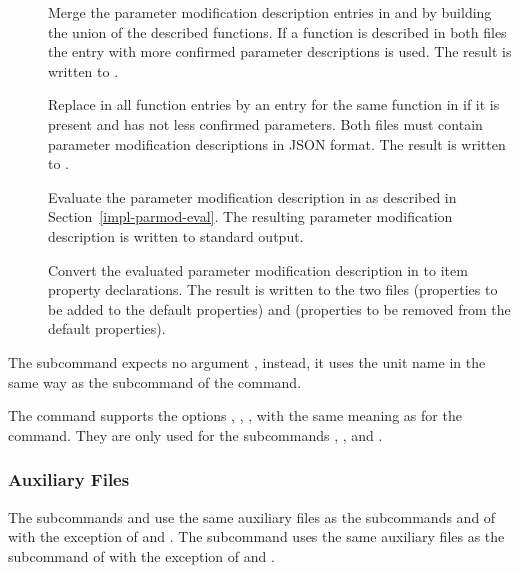 \begin{description}
\item[] Merge the parameter modification description entries in  and  by building 
the union of the described functions. If a function is described in both files the entry with more confirmed parameter 
descriptions is used. The result is written to .

\item[] Replace in  all function entries by an entry for the same function in 
if it is present and has not less confirmed parameters. Both files must contain 
parameter modification descriptions in JSON format. The result is written to .

\item[] Evaluate the parameter modification description in  as described in 
Section~\ref{impl-parmod-eval}.  The resulting parameter modification description is written to standard output.

\item[] Convert the evaluated parameter modification description in  to item property declarations.
The result is written to the two files  (properties to be added to the default properties) 
and  (properties to be removed from the default properties).

\end{description}

The subcommand  expects no argument , instead, it uses the unit name in the same way as the subcommand  
of the  command.

The  command supports the options , , ,  with the same meaning as
for the  command. They are only used for the subcommands , , and .

\subsubsection{Auxiliary Files}

The subcommands  and  use the same auxiliary files as the subcommands  and  of  with 
the exception of  and .
The subcommand  uses the same auxiliary files as the subcommand  of  with the exception
of  and .

